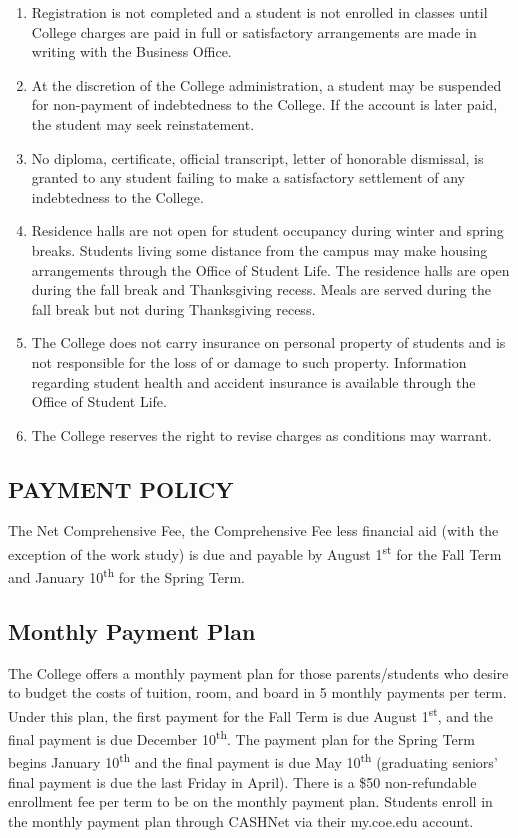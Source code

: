 \documentclass[
  letterpaper,
]{scrbook}
\providecommand{\tightlist}{%
  \setlength{\itemsep}{0pt}\setlength{\parskip}{0pt}}
\begin{document}
\begin{enumerate}
\def\labelenumi{\arabic{enumi}.}
\tightlist
\item
  Registration is not completed and a student is not enrolled in classes
  until College charges are paid in full or satisfactory arrangements
  are made in writing with the Business Office.
\item
  At the discretion of the College administration, a student may be
  suspended for non-payment of indebtedness to the College. If the
  account is later paid, the student may seek reinstatement.
\item
  No diploma, certificate, official transcript, letter of honorable
  dismissal, is granted to any student failing to make a satisfactory
  settlement of any indebtedness to the College.
\item
  Residence halls are not open for student occupancy during winter and
  spring breaks. Students living some distance from the campus may make
  housing arrangements through the Office of Student Life. The residence
  halls are open during the fall break and Thanksgiving recess. Meals
  are served during the fall break but not during Thanksgiving recess.
\item
  The College does not carry insurance on personal property of students
  and is not responsible for the loss of or damage to such property.
  Information regarding student health and accident insurance is
  available through the Office of Student Life.
\item
  The College reserves the right to revise charges as conditions may
  warrant.
\end{enumerate}

\subsection{PAYMENT POLICY}\label{payment-policy}

The Net Comprehensive Fee, the Comprehensive Fee less financial aid
(with the exception of the work study) is due and payable by August
1\textsuperscript{st} for the Fall Term and January
10\textsuperscript{th} for the Spring Term.

\subsection{Monthly Payment Plan}\label{monthly-payment-plan}

The College offers a monthly payment plan for those parents/students who
desire to budget the costs of tuition, room, and board in 5 monthly
payments per term. Under this plan, the first payment for the Fall Term
is due August 1\textsuperscript{st}, and the final payment is due
December 10\textsuperscript{th}. The payment plan for the Spring Term
begins January 10\textsuperscript{th} and the final payment is due May
10\textsuperscript{th} (graduating seniors' final payment is due the
last Friday in April). There is a \$50 non-refundable enrollment fee per
term to be on the monthly payment plan. Students enroll in the monthly
payment plan through CASHNet via their my.coe.edu account.
\end{document}
